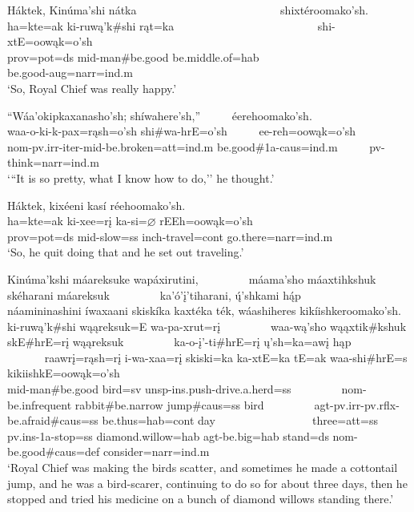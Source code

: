 \begin{exe}
\item\label{EJ47} \glll Háktek, Kinúma'shi nátka ~ ~ ~ ~ ~ ~ ~ ~ ~ ~ ~ ~ ~ ~ ~ shixtéroomako'sh.\\
ha=kte=ak ki-ruwą'k\#shi rąt=ka ~ ~ ~ ~ ~ ~ ~ ~ ~ ~ ~ ~ ~ ~ ~ shi-xtE=oowąk=o'sh\\
prov=pot=ds mid-\textnormal{man}\#\textnormal{be.good} \textnormal{be.middle.of}=hab ~ ~ ~ ~ ~ ~ ~ ~ ~ ~ ~ ~ ~ ~ ~ \textnormal{be.good}-aug=narr=ind.m\\
\glt `So, Royal Chief was really happy.'

\item\label{EJ48} \glll ``Wáa'okipkaxanasho'sh; shíwahere'sh,'' ~ ~ ~ éerehoomako'sh.\\
waa-o-ki-k-pax=rąsh=o'sh shi\#wa-hrE=o'sh ~ ~ ~ ee-reh=oowąk=o'sh\\
nom-pv.irr-iter-mid-\textnormal{be.broken}=att=ind.m \textnormal{be.good}\#1a-caus=ind.m ~ ~ ~ pv-\textnormal{think}=narr=ind.m\\
\glt `{``}It is so pretty, what I know how to do,'' he thought.'

\item\label{EJ49} \glll Háktek, kixéeni kasí réehoomako'sh.\\
ha=kte=ak ki-xee=rį ka-si=$\varnothing$ rEEh=oowąk=o'sh\\
prov=pot=ds mid-\textnormal{slow}=ss inch-\textnormal{travel}=cont \textnormal{go.there}=narr=ind.m\\
\glt `So, he quit doing that and he set out traveling.' 

\item\label{EJ50} \glll Kinúma'kshi máareksuke wapáxirutini, ~ ~ ~ ~ ~ máama'sho máaxtihkshuk skéharani máareksuk ~ ~ ~ ~ ~ ka'ó'į'tiharani, ų́'shkami hą́p ~ ~ ~ ~ ~ ~ ~ ~ ~ ~ náamininashini íwaxaani skiskíka kaxtéka ték, wáashiheres kikíishkeroomako'sh.\\
ki-ruwą'k\#shi wąąreksuk=E wa-pa-xrut=rį ~ ~ ~ ~ ~ waa-wą'sho wąąxtik\#kshuk skE\#hrE=rį wąąreksuk ~ ~ ~ ~ ~ ka-o-į'-ti\#hrE=rį ų'sh=ka=awį hąp ~ ~ ~ ~ ~ ~ ~ ~ ~ ~ raawrį=rąsh=rį i-wa-xaa=rį skiski=ka ka-xtE=ka tE=ak waa-shi\#hrE=s kikiishkE=oowąk=o'sh\\
mid-\textnormal{man}\#\textnormal{be.good} \textnormal{bird}=sv unsp-ins.push-\textnormal{drive.a.herd}=ss ~ ~ ~ ~ ~ nom-\textnormal{be.infrequent} \textnormal{rabbit}\#\textnormal{be.narrow} \textnormal{jump}\#caus=ss \textnormal{bird} ~ ~ ~ ~ ~ agt-pv.irr-pv.rflx-\textnormal{be.afraid}\#caus=ss \textnormal{be.thus}=hab=cont \textnormal{day} ~ ~ ~ ~ ~ ~ ~ ~ ~ ~ \textnormal{three}=att=ss pv.ins-1a-\textnormal{stop}=ss \textnormal{diamond.willow}=hab agt-\textnormal{be.big}=hab \textnormal{stand}=ds nom-\textnormal{be.good}\#caus=def \textnormal{consider}=narr=ind.m\\
\glt `Royal Chief was making the birds scatter, and sometimes he made a cottontail jump, and he was a bird-scarer, continuing to do so for about three days, then he stopped and tried his medicine on a bunch of diamond willows standing there.'


\end{exe}
